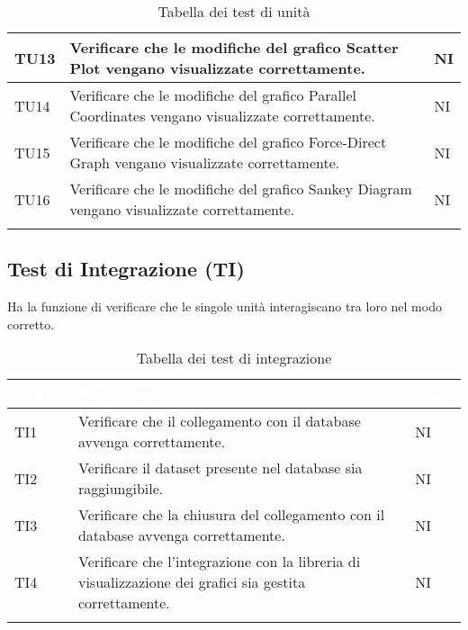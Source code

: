\begin{center}
\begin{longtable}{|p{1.5cm}|p{11cm}|p{1cm}|}
            \rowcolor[HTML]{C0C0C0}
            TU13 & Verificare che le modifiche del grafico Scatter Plot vengano visualizzate correttamente. & NI\\ \hline
            \rowcolor[HTML]{EFEFEF}
            TU14 & Verificare che le modifiche del grafico Parallel Coordinates vengano visualizzate correttamente. & NI\\ \hline
            \rowcolor[HTML]{C0C0C0}
            TU15 & Verificare che le modifiche del grafico Force-Direct Graph vengano visualizzate correttamente. & NI\\ \hline
            \rowcolor[HTML]{EFEFEF}
            TU16 & Verificare che le modifiche del grafico Sankey Diagram vengano visualizzate correttamente. & NI\\ \hline
            \caption{Tabella dei test di unità}
        \end{longtable}
    \end{center}

    \subsection{Test di Integrazione (TI)} Ha la funzione di verificare che le singole unità interagiscano tra loro nel modo corretto.
    \begin{center}
        \renewcommand\arraystretch{1.5}
        \centering
        \begin{longtable}{|p{1.5cm}|p{11cm}|p{1cm}|}
        \hline
        \rowcolor[HTML]{036400}
        \textcolor{white}{\textbf{Codice}} & \textcolor{white}{\textbf{Descrizione}} & \textcolor{white}{\textbf{Stato}} \\ \hline
            \rowcolor[HTML]{EFEFEF}
            TI1 & Verificare che il collegamento con il database avvenga correttamente. & NI\\ \hline
            \rowcolor[HTML]{C0C0C0}
            TI2 & Verificare il dataset presente nel database sia raggiungibile. & NI\\ \hline
            \rowcolor[HTML]{EFEFEF}
            TI3 & Verificare che la chiusura del collegamento con il database avvenga correttamente. & NI\\ \hline
            \rowcolor[HTML]{C0C0C0}
            TI4 & Verificare che l’integrazione con la libreria di visualizzazione dei grafici sia gestita correttamente. & NI\\ \hline   
            \caption{Tabella dei test di integrazione}
        \end{longtable}
    \end{center}

